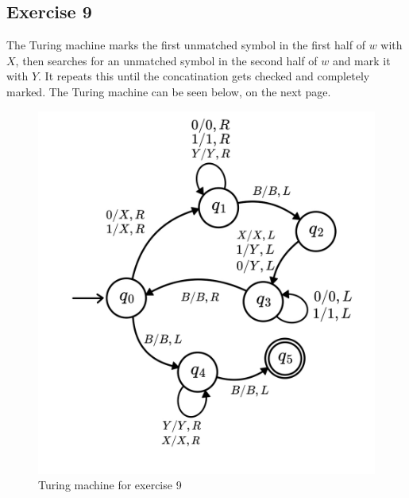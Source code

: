 \documentclass[a4paper]{article}
\begin{document}
\subsection{Exercise 9}

The Turing machine marks the first unmatched symbol in the first half of $w$ with $X$, then searches for an unmatched symbol in the second half of 
$w$ and mark it with $Y$. It repeats this until the concatination gets checked and completely marked. The Turing machine can be seen below, on the next
page.
\newpage

\begin{figure}[ht!]
    \centering
    \includegraphics[scale = 0.25]{assets/Turing-3.jpeg}
    \caption{Turing machine for exercise 9}
\end{figure}
\end{document}
